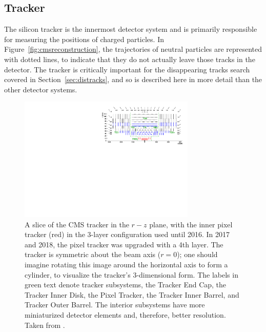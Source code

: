   \subsection{Tracker} \label{sec:tracker}

  The silicon tracker is the innermost detector system and is primarily responsible for measuring the positions of charged particles.  
  In Figure~\ref{fig:cmsreconstruction}, the trajectories of neutral particles are represented with dotted lines, to indicate that they do not actually leave those tracks in the detector.
  The tracker is critically important for the disappearing tracks search covered in Section~\ref{sec:distracks}, and so is described here in more detail than the other detector systems.

  \begin{figure}[h!]
    \centering
    \includegraphics[width=0.75\textwidth]{figures/TrackerLayout.pdf}
    \caption[Layout of the tracker up to 2016.]{
      A slice of the CMS tracker in the $r-z$ plane, with the inner pixel tracker (red) in the 3-layer configuration used until 2016.
      In 2017 and 2018, the pixel tracker was upgraded with a 4th layer.
      The tracker is symmetric about the beam axis ($r=0$); one should imagine rotating this image around the horizontal axis to form a cylinder, to visualize the tracker's 3-dimensional form.
      The labels in green text denote tracker subsystems, the Tracker End Cap, the Tracker Inner Disk, the Pixel Tracker, the Tracker Inner Barrel, and Tracker Outer Barrel.
      The interior subsystems have more miniaturized detector elements and, therefore, better resolution.
      Taken from \cite{cmstracking}.}
    \label{fig:trackerlayout}
  \end{figure}  

